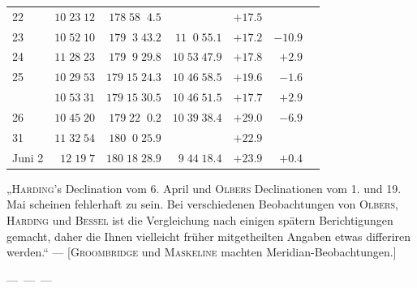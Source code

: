 \begin{longtable}{lrrrrrl}
22 & $10\;23\;12$ & $178\;58\;\;4.5$ &  & $+17.5$ &  &  \\
23 & $10\;52\;10$ & $179\;\;3\;43.2$ & $11\;\;0\;55.1$ & $+17.2$ & $-10.9$ &  \\
24 & $11\;28\;23$ & $179\;\;9\;29.8$ & $10\;53\;47.9$ & $+17.8$ & $+2.9$ &  \\
25 & $10\;29\;53$ & $179\;15\;24.3$ & $10\;46\;58.5$ & $+19.6$ & $-1.6$ &  \\
 & $10\;53\;31$ & $179\;15\;30.5$ & $10\;46\;51.5$ & $+17.7$ & $+2.9$ &  \\
26 & $10\;45\;20$ & $179\;22\;\;0.2$ & $10\;39\;38.4$ & $+29.0$ & $-6.9$ &  \\
31 & $11\;32\;54$ & $180\;\;0\;25.9$ &  & $+22.9$ &  &  \\
Juni 2 & $12\;19\;7$ & $180\;18\;28.9$ & $9\;44\;18.4$ & $+23.9$ & $+0.4$ &  \\
\end{longtable}
\endgroup
\smallskip
\par\indent „\textsc{Harding}'s Declination vom 6. April und \textsc{Olbers} Declinationen vom 1. und 19. Mai
scheinen fehlerhaft zu sein. Bei verschiedenen Beobachtungen von \textsc{Olbers}, \textsc{Harding} und
\textsc{Bessel} ist die Vergleichung nach einigen spätern Berichtigungen gemacht, daher die Ihnen vielleicht
früher mitgetheilten Angaben etwas differiren werden.“ — [\textsc{Groombridge} und \textsc{Maskeline}
machten Meridian-Beobachtungen.]

\smallskip
\noindent---\ ---\ ---

\begin{flushright}
\end{flushright}
